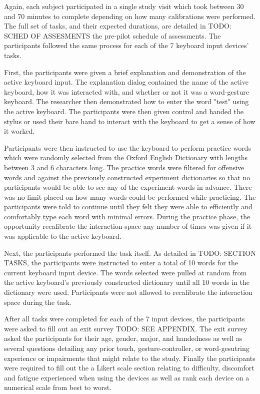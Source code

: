 Again, each subject participated in a single study visit which took between 30 and 70 minutes to complete depending on how many calibrations were performed. The full set of tasks, and their expected durations, are detailed in TODO: SCHED OF ASSESMENTS the pre-pilot schedule of assessments. The participants followed the same process for each of the 7 keyboard input devices' tasks.

First, the participants were given a brief explanation and demonstration of the active keyboard input. The explanation dialog contained the name of the active keyboard, how it was interacted with, and whether or not it was a word-gesture keyboard. The researcher then demonstrated how to enter the word "test" using the active keyboard. The participants were then given control and handed the stylus or used their bare hand to interact with the keyboard to get a sense of how it worked.

Participants were then instructed to use the keyboard to perform practice words which were randomly selected from the Oxford English Dictionary with lengths between 3 and 6 characters long. The practice words were filtered for offensive words and against the previously constructed experiment dictionaries so that no participants would be able to see any of the experiment words in advance. There was no limit placed on how many words could be performed while practicing. The participants were told to continue until they felt they were able to efficiently and comfortably type each word with minimal errors. During the practice phase, the opportunity recalibrate the interaction-space any number of times was given if it was applicable to the active keyboard.

Next, the participants performed the task itself. As detailed in TODO: SECTION TASKS, the participants were instructed to enter a total of 10 words for the current keyboard input device. The words selected were pulled at random from the active keyboard's previously constructed dictionary until all 10 words in the dictionary were used. Participants were not allowed to recalibrate the interaction space during the task. 

After all tasks were completed for each of the 7 input devices, the participants were asked to fill out an exit survey TODO: SEE APPENDIX. The exit survey asked the participants for their age, gender, major, and handedness as well as several questions detailing any prior touch, gesture-controller, or word-gesutring experience or impairments that might relate to the study. Finally the participants were required to fill out the a Likert scale section relating to difficulty, discomfort and fatigue experienced when using the devices as well as rank each device on a numerical scale from best to worst.


